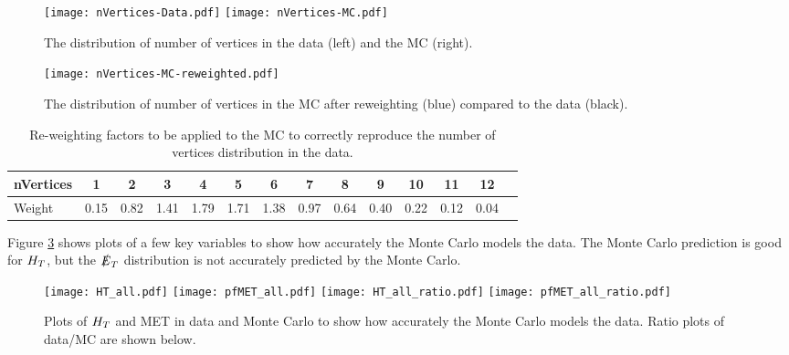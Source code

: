 \begin{figure}
\texttt{[image: nVertices-Data.pdf]}
\texttt{[image: nVertices-MC.pdf]}
\caption{The distribution of number of vertices in the data (left) and the MC
(right).}
\label{fig:nVertices}
\end{figure}

\begin{figure}
\begin{center}
\texttt{[image: nVertices-MC-reweighted.pdf]}
\end{center}
\caption{The distribution of number of vertices in the MC after reweighting
(blue) compared to the data (black).}
\label{fig:reweighted}
\end{figure}

\begin{table}
\begin{center}
{\scriptsize
\begin{tabular}{|l|c|c|c|c|c|c|c|c|c|c|c|c|c|}
\hline
nVertices & 1 & 2 & 3 & 4 & 5 & 6 & 7 & 8 & 9 & 10 & 11 & 12 \\
\hline
Weight & 0.15 & 0.82 & 1.41 & 1.79 & 1.71 & 1.38 & 0.97 & 0.64 & 0.40 & 0.22 &
0.12 & 0.04 \\
\hline
\end{tabular}}
\end{center}
\caption{Re-weighting factors to be applied to the MC to correctly reproduce the
number of vertices distribution in the data.}
\label{tab:factors}
\end{table}

Figure \ref{fig:Data_vs_MC} shows plots of a few key variables to show how
accurately the Monte Carlo models the data. The Monte Carlo prediction is
good for $H_{T}$, but the $\slashed{E}_{T}$ distribution is not accurately predicted by the 
Monte Carlo. \\

\begin{figure}
\texttt{[image: HT\_all.pdf]}
\texttt{[image: pfMET\_all.pdf]}
\texttt{[image: HT\_all\_ratio.pdf]}
\texttt{[image: pfMET\_all\_ratio.pdf]}
\caption{Plots of $H_{T}$ and MET in data and Monte Carlo to show how accurately
the Monte Carlo models the data. Ratio plots of data/MC are shown below.}
\label{fig:Data_vs_MC}
\end{figure}


